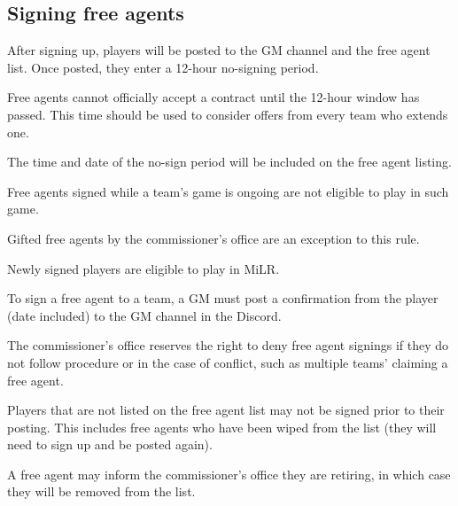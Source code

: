 \subsection{Signing free agents}
\begin{deepEnumerate}
	\item After signing up, players will be posted to the GM channel and the free agent list.
	Once posted, they enter a 12-hour no-signing period.
	\begin{deepEnumerate}
		\item Free agents cannot officially accept a contract until the 12-hour window has passed.
		This time should be used to consider offers from every team who extends one.
		\item The time and date of the no-sign period will be included on the free agent listing.
	\end{deepEnumerate}
	\item Free agents signed while a team's game is ongoing are not eligible to play in such game.
	\begin{deepEnumerate}
		\item Gifted free agents by the commissioner’s office are an exception to this rule.
		\item Newly signed players are eligible to play in MiLR.
	\end{deepEnumerate}
	\item To sign a free agent to a team, a GM must post a confirmation from the player
	(date included) to the GM channel in the Discord.
	\item The commissioner's office reserves the right to deny free agent signings
	if they do not follow procedure or in the case of conflict,
	such as multiple teams' claiming a free agent.
	\item Players that are not listed on the free agent list may not be signed prior to their posting.
	This includes free agents who have been wiped from the list
	(they will need to sign up and be posted again).
	\item A free agent may inform the commissioner's office they are retiring,
	in which case they will be removed from the list.
\end{deepEnumerate}

